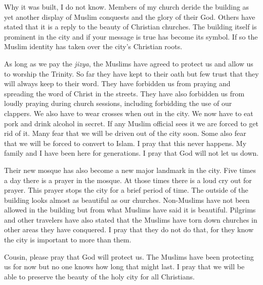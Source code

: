 \documentclass[12pt]{article}
\begin{document}
Why it was built, I do not know.
Members of my church deride the building as yet another display of Muslim conquests and the glory of their God.
Others have stated that it is a reply to the beauty of Christian churches.
The building itself is prominent in the city and if your message is true has become its symbol.
If so the Muslim identity has taken over the city's Christian roots.

As long as we pay the \emph{jizya}, the Muslims have agreed to protect us and allow us to worship the Trinity.
So far they have kept to their oath but few trust that they will always keep to their word.
They have forbidden us from praying and spreading the word of Christ in the streets.
They have also forbidden us from loudly praying during church sessions, including forbidding the use of our clappers.
We also have to wear crosses when out in the city.
We now have to eat pork and drink alcohol in secret.
If any Muslim official sees it we are forced to get rid of it.
Many fear that we will be driven out of the city soon.
Some also fear that we will be forced to convert to Islam.
I pray that this never happens.
My family and I have been here for generations.
I pray that God will not let us down.

Their new mosque has also become a new major landmark in the city.
Five times a day there is a prayer in the mosque.
At those times there is a loud cry out for prayer.
This prayer stops the city for a brief period of time.
The outside of the building looks almost as beautiful as our churches.
Non-Muslims have not been allowed in the building but from what Muslims have said it is beautiful.
Pilgrims and other travelers have also stated that the Muslims have torn down churches in other areas they have conquered.
I pray that they do not do that, for they know the city is important to more than them.

Cousin, please pray that God will protect us.
The Muslims have been protecting us for now but no one knows how long that might last.
I pray that we will be able to preserve the beauty of the holy city for all Christians.
\end{document}
